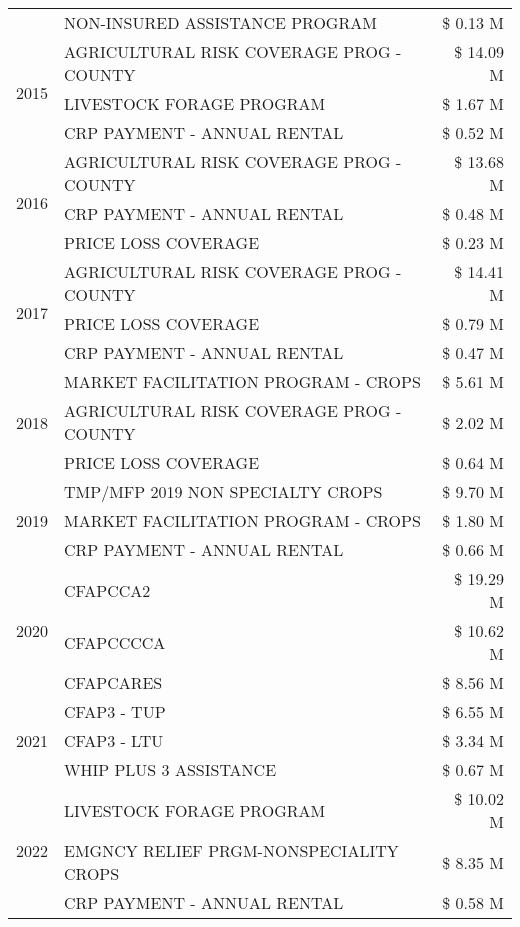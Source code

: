 \begin{tabular}{llr}
 & NON-INSURED ASSISTANCE PROGRAM & \$ 0.13 M \\
\cline{1-3}
\multirow[t]{3}{*}{2015} & AGRICULTURAL RISK COVERAGE PROG - COUNTY & \$ 14.09 M \\
 & LIVESTOCK FORAGE PROGRAM & \$ 1.67 M \\
 & CRP PAYMENT - ANNUAL RENTAL & \$ 0.52 M \\
\cline{1-3}
\multirow[t]{3}{*}{2016} & AGRICULTURAL RISK COVERAGE PROG - COUNTY & \$ 13.68 M \\
 & CRP PAYMENT - ANNUAL RENTAL & \$ 0.48 M \\
 & PRICE LOSS COVERAGE & \$ 0.23 M \\
\cline{1-3}
\multirow[t]{3}{*}{2017} & AGRICULTURAL RISK COVERAGE PROG - COUNTY & \$ 14.41 M \\
 & PRICE LOSS COVERAGE & \$ 0.79 M \\
 & CRP PAYMENT - ANNUAL RENTAL & \$ 0.47 M \\
\cline{1-3}
\multirow[t]{3}{*}{2018} & MARKET FACILITATION PROGRAM - CROPS & \$ 5.61 M \\
 & AGRICULTURAL RISK COVERAGE PROG - COUNTY & \$ 2.02 M \\
 & PRICE LOSS COVERAGE & \$ 0.64 M \\
\cline{1-3}
\multirow[t]{3}{*}{2019} & TMP/MFP 2019 NON SPECIALTY CROPS & \$ 9.70 M \\
 & MARKET FACILITATION PROGRAM - CROPS & \$ 1.80 M \\
 & CRP PAYMENT - ANNUAL RENTAL & \$ 0.66 M \\
\cline{1-3}
\multirow[t]{3}{*}{2020} & CFAPCCA2 & \$ 19.29 M \\
 & CFAPCCCCA & \$ 10.62 M \\
 & CFAPCARES & \$ 8.56 M \\
\cline{1-3}
\multirow[t]{3}{*}{2021} & CFAP3 - TUP & \$ 6.55 M \\
 & CFAP3 - LTU & \$ 3.34 M \\
 & WHIP PLUS 3 ASSISTANCE & \$ 0.67 M \\
\cline{1-3}
\multirow[t]{3}{*}{2022} & LIVESTOCK FORAGE PROGRAM & \$ 10.02 M \\
 & EMGNCY RELIEF PRGM-NONSPECIALITY CROPS & \$ 8.35 M \\
 & CRP PAYMENT - ANNUAL RENTAL & \$ 0.58 M \\
\cline{1-3}
\bottomrule
\end{tabular}
